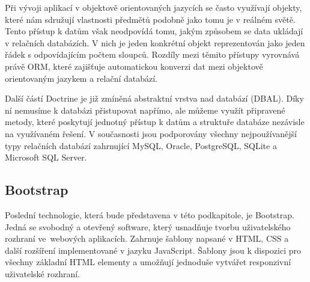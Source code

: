 Při vývoji aplikací v objektově orientovaných jazycích se často využívají objekty, které nám sdružují vlastnosti předmětů podobně jako tomu je v reálném světě. Tento přístup k datům však neodpovídá tomu, jakým způsobem se data ukládají v relačních databázích. V nich je jeden konkrétní objekt reprezentován jako jeden řádek s odpovídajícím počtem sloupců. Rozdíly mezi těmito přístupy vyrovnává právě ORM, které zajišťuje automatickou konverzi dat mezi objektově orientovaným jazykem a relační databází. \cite{doctrine_orm}

Další částí Doctrine je již zmíněná abstraktní vrstva nad databází (DBAL). Díky ní nemusíme k databázi přistupovat napřímo, ale můžeme využít připravené metody, které poskytují jednotný přístup k datům a struktuře databáze nezávisle na využívaném řešení. V současnosti jsou podporovány všechny nejpoužívanější typy relačních databází zahrnující MySQL, Oracle, PostgreSQL, SQLite a Microsoft SQL Server. \cite{doctrine_dbal}

\subsection{Bootstrap}\label{bootstrap}
Poslední technologie, která bude představena v této podkapitole, je Bootstrap. Jedná se svobodný a otevřený software, který usnadňuje tvorbu uživatelského rozhraní ve~webových aplikacích. Zahrnuje šablony napsané v HTML, CSS a další rozšíření implementované v jazyku JavaScript. Šablony jsou k dispozici pro všechny základní HTML elementy a umožňují jednoduše vytvářet responzivní uživatelské rozhraní. \cite{bootstrap}
